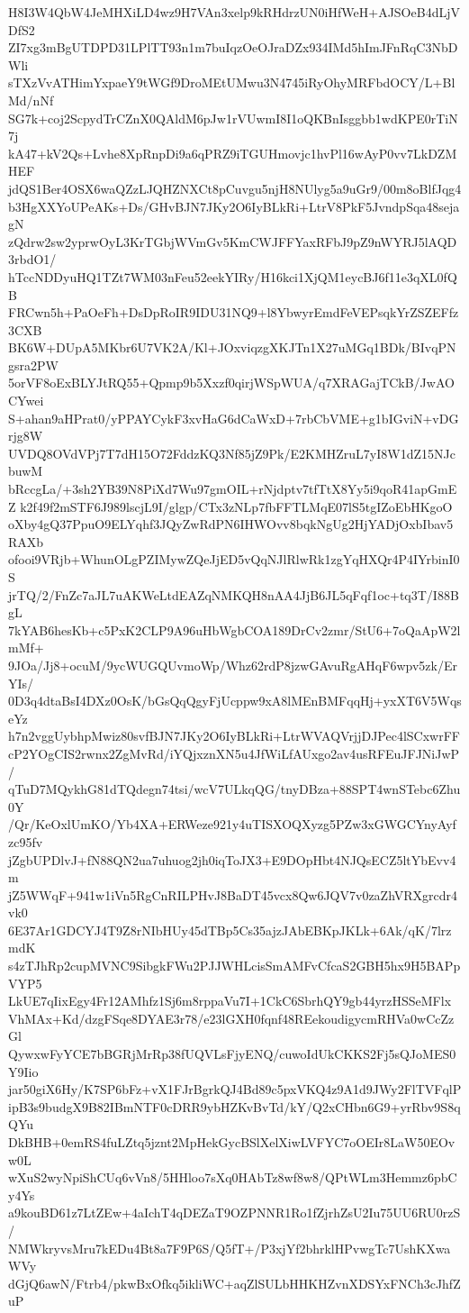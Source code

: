 H8I3W4QbW4JeMHXiLD4wz9H7VAn3xelp9kRHdrzUN0iHfWeH+AJSOeB4dLjVDfS2
ZI7xg3mBgUTDPD31LPlTT93n1m7buIqzOeOJraDZx934IMd5hImJFnRqC3NbDWli
sTXzVvATHimYxpaeY9tWGf9DroMEtUMwu3N4745iRyOhyMRFbdOCY/L+BlMd/nNf
SG7k+coj2ScpydTrCZnX0QAldM6pJw1rVUwmI8I1oQKBnIsggbb1wdKPE0rTiN7j
kA47+kV2Qs+Lvhe8XpRnpDi9a6qPRZ9iTGUHmovjc1hvPl16wAyP0vv7LkDZMHEF
jdQS1Ber4OSX6waQZzLJQHZNXCt8pCuvgu5njH8NUlyg5a9uGr9/00m8oBlfJqg4
b3HgXXYoUPeAKs+Ds/GHvBJN7JKy2O6IyBLkRi+LtrV8PkF5JvndpSqa48sejagN
zQdrw2sw2yprwOyL3KrTGbjWVmGv5KmCWJFFYaxRFbJ9pZ9nWYRJ5lAQD3rbdO1/
hTccNDDyuHQ1TZt7WM03nFeu52eekYIRy/H16kci1XjQM1eycBJ6f11e3qXL0fQB
FRCwn5h+PaOeFh+DsDpRoIR9IDU31NQ9+l8YbwyrEmdFeVEPsqkYrZSZEFfz3CXB
BK6W+DUpA5MKbr6U7VK2A/Kl+JOxviqzgXKJTn1X27uMGq1BDk/BIvqPNgsra2PW
5orVF8oExBLYJtRQ55+Qpmp9b5Xxzf0qirjWSpWUA/q7XRAGajTCkB/JwAOCYwei
S+ahan9aHPrat0/yPPAYCykF3xvHaG6dCaWxD+7rbCbVME+g1bIGviN+vDGrjg8W
UVDQ8OVdVPj7T7dH15O72FddzKQ3Nf85jZ9Pk/E2KMHZruL7yI8W1dZ15NJcbuwM
bRccgLa/+3sh2YB39N8PiXd7Wu97gmOIL+rNjdptv7tfTtX8Yy5i9qoR41apGmEZ
k2f49f2mSTF6J989lscjL9I/glgp/CTx3zNLp7fbFFTLMqE07lS5tgIZoEbHKgoO
oXby4gQ37PpuO9ELYqhf3JQyZwRdPN6IHWOvv8bqkNgUg2HjYADjOxbIbav5RAXb
ofooi9VRjb+WhunOLgPZIMywZQeJjED5vQqNJlRlwRk1zgYqHXQr4P4IYrbinI0S
jrTQ/2/FnZc7aJL7uAKWeLtdEAZqNMKQH8nAA4JjB6JL5qFqf1oc+tq3T/I88BgL
7kYAB6hesKb+c5PxK2CLP9A96uHbWgbCOA189DrCv2zmr/StU6+7oQaApW2lmMf+
9JOa/Jj8+ocuM/9ycWUGQUvmoWp/Whz62rdP8jzwGAvuRgAHqF6wpv5zk/ErYIs/
0D3q4dtaBsI4DXz0OsK/bGsQqQgyFjUcppw9xA8lMEnBMFqqHj+yxXT6V5WqseYz
h7n2vggUybhpMwiz80svfBJN7JKy2O6IyBLkRi+LtrWVAQVrjjDJPec4lSCxwrFF
cP2YOgCIS2rwnx2ZgMvRd/iYQjxznXN5u4JfWiLfAUxgo2av4usRFEuJFJNiJwP/
qTuD7MQykhG81dTQdegn74tsi/wcV7ULkqQG/tnyDBza+88SPT4wnSTebc6Zhu0Y
/Qr/KeOxlUmKO/Yb4XA+ERWeze921y4uTISXOQXyzg5PZw3xGWGCYnyAyfzc95fv
jZgbUPDlvJ+fN88QN2ua7uhuog2jh0iqToJX3+E9DOpHbt4NJQsECZ5ltYbEvv4m
jZ5WWqF+941w1iVn5RgCnRILPHvJ8BaDT45vcx8Qw6JQV7v0zaZhVRXgrcdr4vk0
6E37Ar1GDCYJ4T9Z8rNIbHUy45dTBp5Cs35ajzJAbEBKpJKLk+6Ak/qK/7lrzmdK
s4zTJhRp2cupMVNC9SibgkFWu2PJJWHLcisSmAMFvCfcaS2GBH5hx9H5BAPpVYP5
LkUE7qIixEgy4Fr12AMhfz1Sj6m8rppaVu7I+1CkC6SbrhQY9gb44yrzHSSeMFlx
VhMAx+Kd/dzgFSqe8DYAE3r78/e23lGXH0fqnf48REekoudigycmRHVa0wCcZzGl
QywxwFyYCE7bBGRjMrRp38fUQVLsFjyENQ/cuwoIdUkCKKS2Fj5sQJoMES0Y9Iio
jar50giX6Hy/K7SP6bFz+vX1FJrBgrkQJ4Bd89c5pxVKQ4z9A1d9JWy2FlTVFqlP
ipB3s9budgX9B82IBmNTF0cDRR9ybHZKvBvTd/kY/Q2xCHbn6G9+yrRbv9S8qQYu
DkBHB+0emRS4fuLZtq5jznt2MpHekGycBSlXelXiwLVFYC7oOEIr8LaW50EOvw0L
wXuS2wyNpiShCUq6vVn8/5HHloo7sXq0HAbTz8wf8w8/QPtWLm3Hemmz6pbCy4Ys
a9kouBD61z7LtZEw+4aIchT4qDEZaT9OZPNNR1Ro1fZjrhZsU2Iu75UU6RU0rzS/
NMWkryvsMru7kEDu4Bt8a7F9P6S/Q5fT+/P3xjYf2bhrklHPvwgTc7UshKXwaWVy
dGjQ6awN/Ftrb4/pkwBxOfkq5ikliWC+aqZlSULbHHKHZvnXDSYxFNCh3cJhfZuP
